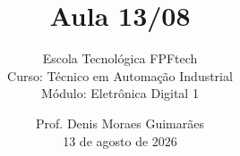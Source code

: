 
\title{Aula 13/08}

\subtitle{
\vspace{1.0cm}
Escola Tecnológica FPFtech\\
\vspace{0.5cm}
Curso: Técnico em Automação Industrial\\
\vspace{0.5cm}
Módulo: Eletrônica Digital 1
\vspace{1.0cm}
}

\author{
Prof. Denis Moraes Guimarães\\
\small 13 de agosto de 2026
}

\date{}